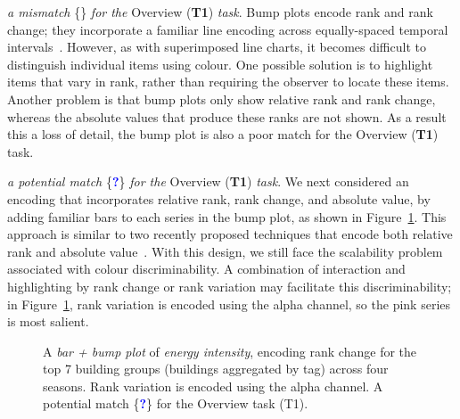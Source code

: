 \documentclass[journal]{vgtc}                %
\newcommand*\mismatch{\textcolor{red}{\ding{54}}}
\newcommand*\posmatch{\textcolor{blue}{{\bf ?}}}
\newcommand{\bstart}[1]{\vspace{1mm} \noindent{\textbf{#1:}}}
\begin{document}
\bstart{Bump plots} {\it a mismatch} \{\mismatch\} {\it for the} Overview ({\bf T1}) {\it task}.
Bump plots encode rank and rank change; they incorporate a familiar line encoding across equally-spaced temporal intervals~\cite{Tufte1990}. 
However, as with superimposed line charts, it becomes difficult to distinguish individual items using colour.
One possible solution is to highlight items that vary in rank, rather than requiring the observer to locate these items.
Another problem is that bump plots only show relative rank and rank change, whereas the absolute values that produce these ranks are not shown. 
As a result this a loss of detail, the bump plot is also a poor match for the Overview ({\bf T1}) task.

\bstart{Bump + bar plots} {\it a potential match} \{\posmatch\} {\it for the} Overview ({\bf T1}) {\it task}.
We next considered an encoding that incorporates relative rank, rank change, and absolute value, by adding familiar bars to each series in the bump plot, as shown in Figure~\ref{fig:sandbox-barbump}. 
This approach is similar to two recently proposed techniques that encode both relative rank and absolute value~\cite{Gratzl2013,Hur2013}. 
With this design, we still face the scalability problem associated with colour discriminability.
A combination of interaction and highlighting by rank change or rank variation may facilitate this discriminability; in Figure~\ref{fig:sandbox-barbump}, rank variation is encoded using the alpha channel, so the pink series is most salient.

\begin{figure}[ht]
    \vspace{-0.3cm}
	\centering
	\vspace{-0.15cm}
	\caption{A \textsl{bar + bump plot} of \textsl{energy intensity}, encoding rank change for the top 7 building groups (buildings aggregated by tag) across four seasons. Rank variation is encoded using the alpha channel. A potential match  \{\posmatch\} for the Overview task (T1).}
	\label{fig:sandbox-barbump}
	\vspace{-0.3cm}
\end{figure}
\end{document}
